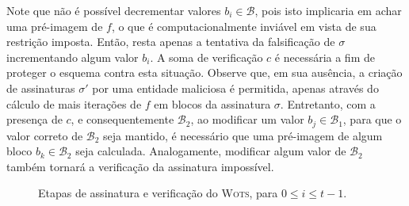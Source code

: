 \documentclass{ufsctex/ufsctex}
\newcommand{\bone}{\mathcal{B}_{1}}
\newcommand{\btwo}{\mathcal{B}_{2}}
\newcommand{\wots}{\textsc{Wots}}
\begin{document}
Note que não é possível decrementar valores $b_{i} \in \mathcal{B}$, pois isto
implicaria em achar uma pré-imagem de $f$, o que é computacionalmente inviável
em vista de sua restrição imposta. Então, resta apenas a tentativa da
falsificação de $\sigma$ incrementando algum valor $b_{i}$. A soma de
verificação $c$ é necessária a fim de proteger o esquema contra esta situação.
Observe que, em sua ausência, a criação de assinaturas $\sigma'$ por uma
entidade maliciosa é permitida, apenas através do cálculo de mais iterações de
$f$ em blocos da assinatura $\sigma$. Entretanto, com a presença de $c$, e
consequentemente $\btwo{}$, ao modificar um valor $b_{j} \in \bone{}$, para que
o valor correto de $\btwo{}$ seja mantido, é necessário que uma pré-imagem de
algum bloco $b_{k} \in \btwo{}$ seja calculada. Analogamente, modificar algum
valor de $\btwo{}$ também tornará a verificação da assinatura impossível.

\begin{figure}
  \centering
  \caption{Etapas de assinatura e verificação do \wots{},
    para $0 \leq i \leq t - 1$.}\label{fig:5}
\end{figure}
\end{document}
